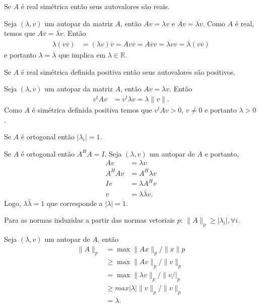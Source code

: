 \begin{questions}
    \question Se $A$ \'{e} real sim\'{e}trica ent\~{a}o seus autovalores s\~{a}o reais.
    \begin{solution}
        Seja $(\lambda, v)$ um autopar da matriz $A$, ent\~{a}o $A v = \lambda v$ e $\overline{A v} = \overline{\lambda v}$. Como $A$ \'{e} real, temos que $A \overline{v} = \overline{\lambda v}$. Ent\~{a}o
        \begin{align*}
            \lambda (v \overline{v}) &= (\lambda v) \overline{v} = A v \overline{v} = A \overline{v} v = \overline{\lambda v} v = \overline{\lambda} (v \overline{v})
        \end{align*}
        e portanto $\lambda = \overline{\lambda}$ que implica em $\lambda \in \mathbb{R}$.
    \end{solution}

    \question Se $A$ \'{e} real sim\'{e}trica definida positiva ent\~{a}o seus autovalores s\~{a}o positivos.
    \begin{solution}
        Seja $(\lambda, v)$ um autopar da matriz $A$, ent\~{a}o $A v = \lambda v$. Ent\~{a}o
        \begin{align*}
            v^t A v &= v^t \lambda v = \lambda \| v \|.
        \end{align*}
        Como $A$ \'{e} sim\'{e}trica definida positiva temos que $v^t A v > 0$, $v \neq 0$ e portanto $\lambda > 0$.
    \end{solution}

    \question Se $A$ \'{e} ortogonal ent\~{a}o $| \lambda_i | = 1$.
    \begin{solution}
        Se $A$ \'{e} ortogonal ent\~{a}o $A^H A = I$. Seja $(\lambda, v)$ um autopar de $A$ e portanto,
        \begin{align*}
            A v &= \lambda v \\
            A^H A v &= A^H \lambda v \\
            I v &= \lambda A^H v \\
            v &= \lambda \bar{\lambda} v.
        \end{align*}
        Logo, $\lambda \bar{\lambda} = 1$ que corresponde a $|\lambda| = 1$.
    \end{solution}

    \question Para as normas induzidas a partir das normas vetoriais $p$: $\| A \|_p \geq | \lambda_i |, \forall i$.
    \begin{solution}
        Seja $(\lambda, v)$ um autopar de $A$, ent\~{a}o
        \begin{align*}
            \| A \|_p &= \max \| A x \|_p / \| x \| p \\
            &\geq \max \| A v \|_p / \| v \|_p \\
            &= \max \| \lambda v \|_p / \| v /|_p \\
            &\geq max | \lambda | \| v \|_p / \| v \|_p \\
            &= \lambda.
        \end{align*}
    \end{solution}


\end{questions}

